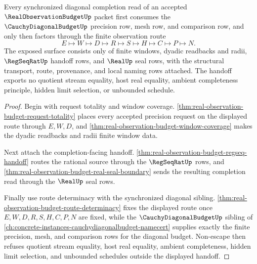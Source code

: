 \begin{theorem}
\label{thm:real-observation-budget-diagonal-cauchy-handoff-totality}
Every synchronized diagonal completion read of an accepted $\RealObservationBudgetUp$ packet first consumes the $\CauchyDiagonalBudgetUp$ precision row, mesh row, and comparison row, and only then factors through the finite observation route
$$
E \longmapsto W \longmapsto D \longmapsto R \longmapsto S \longmapsto H \longmapsto C \longmapsto P \longmapsto N .
$$
The exposed surface consists only of finite windows, dyadic readbacks and radii, $\RegSeqRatUp$ handoff rows, and $\RealUp$ seal rows, with the structural transport, route, provenance, and local naming rows attached. The handoff exports no quotient stream equality, host real equality, ambient completeness principle, hidden limit selection, or unbounded schedule.
\end{theorem}
\begin{proof}
Begin with request totality and window coverage. \autoref{thm:real-observation-budget-request-totality} places every accepted precision request on the displayed route through $E,W,D$, and \autoref{thm:real-observation-budget-window-coverage} makes the dyadic readbacks and radii finite window data.

Next attach the completion-facing handoff. \autoref{thm:real-observation-budget-regseq-handoff} routes the rational source through the $\RegSeqRatUp$ rows, and \autoref{thm:real-observation-budget-real-seal-boundary} sends the resulting completion read through the $\RealUp$ seal rows.

Finally use route determinacy with the synchronized diagonal sibling. \autoref{thm:real-observation-budget-route-determinacy} fixes the displayed route once $E,W,D,R,S,H,C,P,N$ are fixed, while the $\CauchyDiagonalBudgetUp$ sibling of \autoref{ch:concrete-instances-cauchydiagonalbudget-namecert} supplies exactly the finite precision, mesh, and comparison rows for the diagonal budget. Non-escape then refuses quotient stream equality, host real equality, ambient completeness, hidden limit selection, and unbounded schedules outside the displayed handoff.
\end{proof}


